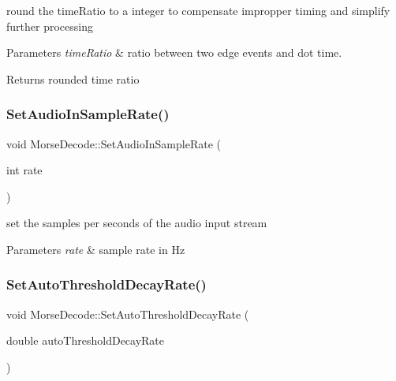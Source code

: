 round the time\+Ratio to a integer to compensate impropper timing and simplify further processing 


\begin{DoxyParams}{Parameters}
{\em time\+Ratio} & ratio between two edge events and dot time. \\
\hline
\end{DoxyParams}
\begin{DoxyReturn}{Returns}
rounded time ratio 
\end{DoxyReturn}
\mbox{\label{classMorseDecode_a34df828f9599e4185b2b0f2999e355b2}} 
\subsubsection{\texorpdfstring{Set\+Audio\+In\+Sample\+Rate()}{SetAudioInSampleRate()}}
{\footnotesize\ttfamily void Morse\+Decode\+::\+Set\+Audio\+In\+Sample\+Rate (\begin{DoxyParamCaption}\item[{int}]{rate }\end{DoxyParamCaption})}



set the samples per seconds of the audio input stream 


\begin{DoxyParams}{Parameters}
{\em rate} & sample rate in Hz \\
\hline
\end{DoxyParams}
\mbox{\label{classMorseDecode_a6fd8645b7dda1b84af1941a9f5d155af}} 
\subsubsection{\texorpdfstring{Set\+Auto\+Threshold\+Decay\+Rate()}{SetAutoThresholdDecayRate()}}
{\footnotesize\ttfamily void Morse\+Decode\+::\+Set\+Auto\+Threshold\+Decay\+Rate (\begin{DoxyParamCaption}\item[{double}]{auto\+Threshold\+Decay\+Rate }\end{DoxyParamCaption})}



